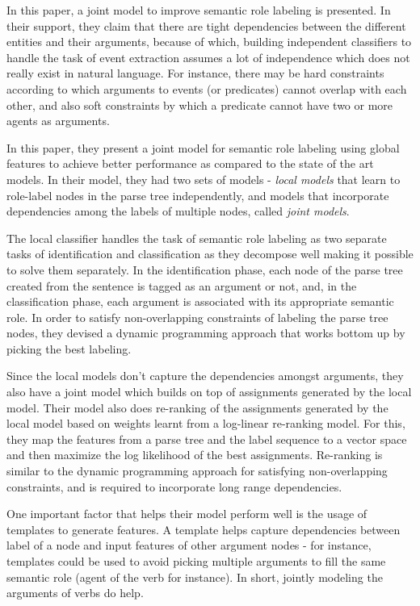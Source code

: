 In this paper, a joint model to improve semantic role labeling is presented. In their support, they claim that there are tight dependencies between the different entities and their arguments, because of which, building independent classifiers to handle the task of event extraction assumes a lot of independence which does not really exist in natural language. For instance, there may be hard constraints according to which arguments to events (or predicates) cannot overlap with each other, and also soft constraints by which a predicate cannot have two or more agents as arguments. 

In this paper, they present a joint model for semantic role labeling using global features to achieve better performance as compared to the state of the art models. In their model, they had two sets of models - \emph{local models} that learn to role-label nodes in the parse tree independently, and models that incorporate dependencies among the labels of multiple nodes, called \emph{joint models}. 

The local classifier handles the task of semantic role labeling as two separate tasks of identification and classification as they decompose well making it possible to solve them separately. In the identification phase, each node of the parse tree created from the sentence is tagged as an argument or not, and, in the classification phase, each argument is associated with its appropriate semantic role. In order to satisfy non-overlapping constraints of labeling the parse tree nodes, they devised a dynamic programming approach that works bottom up by picking the best labeling. 

Since the local models don't capture the dependencies amongst arguments, they also have a joint model which builds on top of assignments generated by the local model. Their model also does re-ranking of the assignments generated by the local model based on weights learnt from a log-linear re-ranking model. For this, they map the features from a parse tree and the label sequence to a vector space and then maximize the log likelihood of the best assignments. Re-ranking is similar to the dynamic programming approach for satisfying non-overlapping constraints, and is required to incorporate long range dependencies. 

One important factor that helps their model perform well is the usage of templates to generate features. A template helps capture dependencies between label of a node and input features of other argument nodes - for instance, templates could be used to avoid picking multiple arguments to fill the same semantic role (agent of the verb for instance). In short, jointly modeling the arguments of verbs do help.\\

